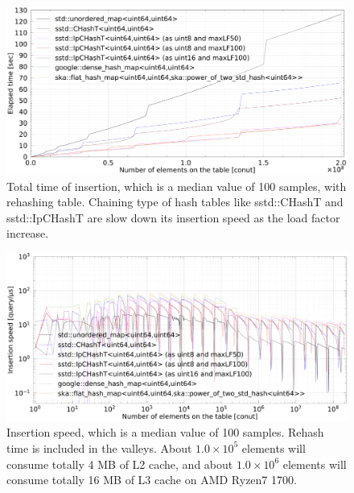 \begin{figure}[h]
  \includegraphics[scale=0.24]{./fig_bench/insert_et_med.pdf}
  \caption{
    Total time of insertion, which is a median value of 100 samples, with rehashing table.
    Chaining type of hash tables like sstd::CHashT and sstd::IpCHashT are slow down its insertion speed as the load factor increase.
  }
  \label{fig_bench_insert_wRehash}
\end{figure}

\begin{figure}[h]
  \hspace{-3mm}
  \includegraphics[scale=0.24]{./fig_bench/insert_med.pdf}
  \caption{
    Insertion speed, which is a median value of 100 samples.
    Rehash time is included in the valleys.
    About $1.0\times10^5$ elements will consume totally 4 MB of L2 cache,
    and about $1.0\times10^6$ elements will consume totally 16 MB of L3 cache on AMD Ryzen7 1700.
  }
  \label{fig_bench_insert}
\end{figure}


